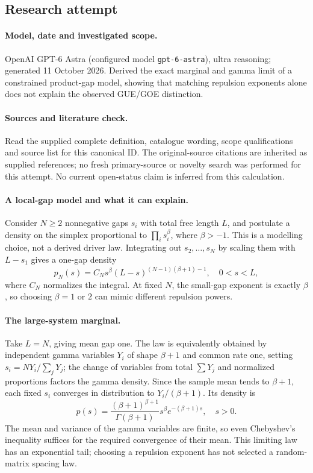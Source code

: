 \documentclass[11pt]{article}
\begin{document}
\subsection{Research attempt}
\paragraph{Model, date and investigated scope.}
OpenAI GPT-6 Astra (configured model \texttt{gpt-6-astra}), ultra reasoning; generated 11 October 2026. Derived the exact marginal and gamma limit of a constrained product-gap model, showing that matching repulsion exponents alone does not explain the observed GUE/GOE distinction.

\paragraph{Sources and literature check.}
Read the supplied complete definition, catalogue wording, scope qualifications and source list for this canonical ID. The original-source citations are inherited as supplied references; no fresh primary-source or novelty search was performed for this attempt. No current open-status claim is inferred from this calculation.

\paragraph{A local-gap model and what it can explain.}Consider \(N\ge2\) nonnegative gaps \(s_i\) with total free length \(L\), and postulate a density on the simplex proportional to \(\prod_i s_i^\beta\), where \(\beta>-1\). This is a modelling choice, not a derived driver law. Integrating out \(s_2,\ldots,s_N\) by scaling them with \(L-s_1\) gives a one-gap density
\[p_N(s)=C_N s^\beta(L-s)^{(N-1)(\beta+1)-1},\quad0<s<L,
\]
where \(C_N\) normalizes the integral. At fixed \(N\), the small-gap exponent is exactly \(\beta\), so choosing \(\beta=1\) or \(2\) can mimic different repulsion powers.
\paragraph{The large-system marginal.}Take \(L=N\), giving mean gap one. The law is equivalently obtained by independent gamma variables \(Y_i\) of shape \(\beta+1\) and common rate one, setting \(s_i=NY_i/\sum_jY_j\); the change of variables from total \(\sum Y_j\) and normalized proportions factors the gamma density. Since the sample mean tends to \(\beta+1\), each fixed \(s_i\) converges in distribution to \(Y_i/(\beta+1)\). Its density is
\[p(s)=\frac{(\beta+1)^{\beta+1}}{\Gamma(\beta+1)}s^\beta e^{-(\beta+1)s},\quad s>0.
\]
The mean and variance of the gamma variables are finite, so even Chebyshev's inequality suffices for the required convergence of their mean. This limiting law has an exponential tail; choosing a repulsion exponent has not selected a random-matrix spacing law.
\end{document}
